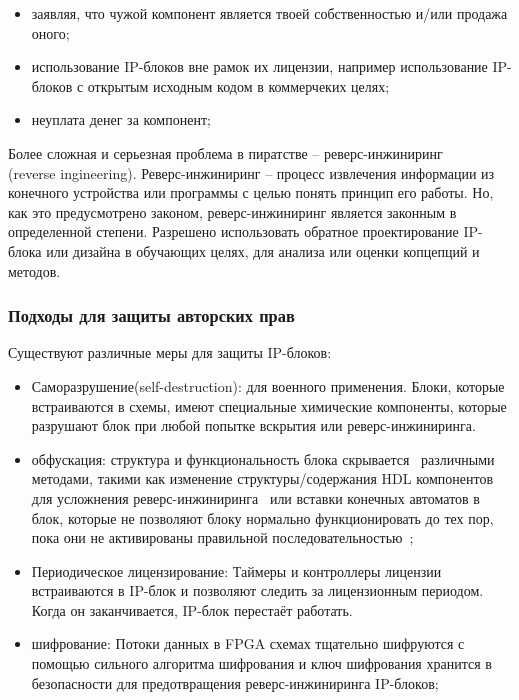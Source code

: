\begin{itemize}
  \item заявляя, что чужой компонент является твоей собственностью и/или продажа оного;
  \item использование IP-блоков вне рамок их лицензии, например использование IP-блоков с открытым исходным кодом в коммерчеких целях;
  \item неуплата денег за компонент;
\end{itemize}

Более сложная и серьезная проблема в пиратстве -- реверс-инжиниринг\\(reverse ingineering). Реверс-инжиниринг -- процесс извлечения информации из конечного устройства или программы с целью понять принцип его работы. Но, как это предусмотрено законом, реверс-инжиниринг является законным в определенной степени. Разрешено использовать обратное проектирование IP-блока  или дизайна в обучающих целях, для анализа или оценки копцепций и методов.

\subsubsection{Подходы для защиты авторских прав}
\label{page:domain:secure_approaches}

Существуют различные меры для защиты IP-блоков:

\begin{itemize}
\item Саморазрушение(self-destruction): для военного применения. Блоки, которые встраиваются в схемы, имеют специальные химические компоненты, которые разрушают блок при любой попытке вскрытия или реверс-инжиниринга.
\item обфускация: структура и функциональность блока скрывается~\cite{obfuscation_soc_design} различными методами, такими как изменение структуры/содержания HDL компонентов для усложнения реверс-инжиниринга~\cite{obf_as_int_rights_prot_in_vhdl} или вставки конечных автоматов  в блок, которые не позволяют блоку нормально функционировать до тех пор, пока они не активированы правильной последовательностью~\cite{rtl_hardware_ip_protection};
\item Периодическое лицензирование: Таймеры и контроллеры лицензии встраиваются в IP-блок и позволяют следить за лицензионным периодом. Когда он заканчивается, IP-блок перестаёт работать.
\item шифрование: Потоки данных в FPGA схемах тщательно шифруются с помощью сильного алгоритма шифрования и ключ шифрования хранится в безопасности для предотвращения реверс-инжиниринга IP-блоков;
\end{itemize}

